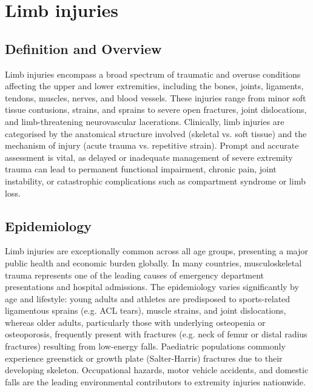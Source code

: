 \chapter{Limb injuries}

\section*{Definition and Overview}
Limb injuries encompass a broad spectrum of traumatic and overuse conditions affecting the upper and lower extremities, including the bones, joints, ligaments, tendons, muscles, nerves, and blood vessels. These injuries range from minor soft tissue contusions, strains, and sprains to severe open fractures, joint dislocations, and limb-threatening neurovascular lacerations. Clinically, limb injuries are categorised by the anatomical structure involved (skeletal vs. soft tissue) and the mechanism of injury (acute trauma vs. repetitive strain). Prompt and accurate assessment is vital, as delayed or inadequate management of severe extremity trauma can lead to permanent functional impairment, chronic pain, joint instability, or catastrophic complications such as compartment syndrome or limb loss.

\section*{Epidemiology}
Limb injuries are exceptionally common across all age groups, presenting a major public health and economic burden globally. In many countries, musculoskeletal trauma represents one of the leading causes of emergency department presentations and hospital admissions. The epidemiology varies significantly by age and lifestyle: young adults and athletes are predisposed to sports-related ligamentous sprains (e.g. ACL tears), muscle strains, and joint dislocations, whereas older adults, particularly those with underlying osteopenia or osteoporosis, frequently present with fractures (e.g. neck of femur or distal radius fractures) resulting from low-energy falls. Paediatric populations commonly experience greenstick or growth plate (Salter-Harris) fractures due to their developing skeleton. Occupational hazards, motor vehicle accidents, and domestic falls are the leading environmental contributors to extremity injuries nationwide.


